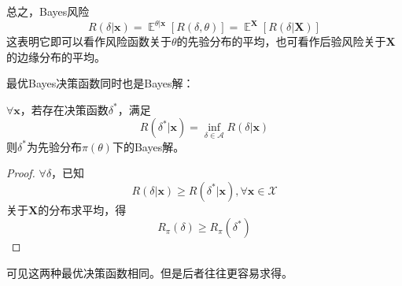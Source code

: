 \documentclass{ctexbook}
\DeclareMathOperator{\E}{\mathbb{E}}     %
\begin{document}
总之，Bayes风险
$$R(\delta|\mathbf{x})=\E^{\theta|\mathbf{x}}[R(\delta,\theta)]=\E^{\mathbf{X}}[R(\delta|\mathbf{X})]$$
这表明它即可以看作风险函数关于$\theta$的先验分布的平均，也可看作后验风险关于$\mathbf{X}$的边缘分布的平均。

最优Bayes决策函数同时也是Bayes解：
\begin{theorem}
    $\forall \mathbf{x}$，若存在决策函数$\delta^*$，满足
    $$R(\delta^*|\mathbf{x})=\inf_{\delta\in\mathcal{A}}R(\delta|\mathbf{x})$$
    则$\delta^*$为先验分布$\pi(\theta)$下的Bayes解。
\end{theorem}
\begin{proof}
    $\forall\delta$，已知
    $$R(\delta|\mathbf{x})\ge R(\delta^*|\mathbf{x}),\forall\mathbf{x}\in\mathcal{X}$$
    关于$\mathbf{X}$的分布求平均，得
    $$R_{\pi}(\delta)\ge R_\pi(\delta^*)$$
\end{proof}

可见这两种最优决策函数相同。但是后者往往更容易求得。
\end{document}
